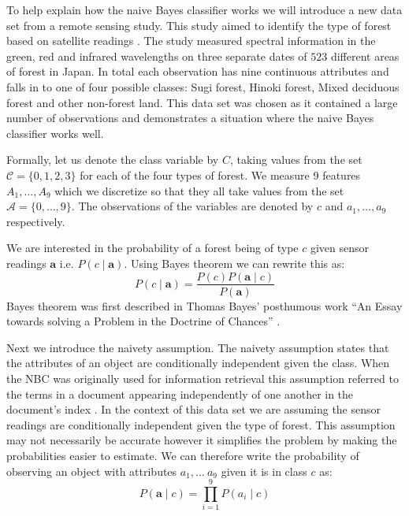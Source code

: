 To help explain how the naive Bayes classifier works we will introduce a new data set from a remote sensing study.
This study aimed to identify the type of forest based on satellite readings \cite{Forrest}.
The study measured spectral information in the green, red and infrared wavelengths on three separate dates of $523$ different areas of forest in Japan.
In total each observation has nine continuous attributes and falls in to one of four possible classes: Sugi forest, Hinoki forest, Mixed deciduous forest and other non-forest land.
This data set was chosen as it contained a large number of observations and demonstrates a situation where the naive Bayes classifier works well.

Formally, let us denote the class variable by $C$, taking values from the set $\mathcal{C} = \{0,1,2,3\}$ for each of the four types of forest.
We measure 9 features $A_1,\dots,A_9$ which we discretize so that they all take values from the set $\mathcal{A} = \{0,\dots,9\}$.
The observations of the variables are denoted by $c$ and $a_1,\dots,a_9$ respectively.

We are interested in the probability of a forest being of type $c$ given sensor readings $\mathbf{a}$ i.e. $P(c \mid \mathbf{a})$.
Using Bayes theorem we can rewrite this as:
\begin{equation} \label{bayes}
	P(c \mid \mathbf{a}) = \frac{P(c)P(\mathbf{a} \mid c)}{P(\mathbf{a})}
\end{equation}
Bayes theorem was first described in Thomas Bayes' posthumous work ``An Essay towards solving a Problem in the Doctrine of Chances'' \cite{Bayes63}.

Next we introduce the naivety assumption.
The naivety assumption states that the attributes of an object are conditionally independent given the class.
When the NBC was originally used for information retrieval this assumption referred to the terms in a document appearing independently of one another in the document's index \cite{Maron60}.
In the context of this data set we are assuming the sensor readings are conditionally independent given the type of forest.
This assumption may not necessarily be accurate however it simplifies the problem by making the probabilities easier to estimate.
We can therefore write the probability of observing an object with attributes $a_1, \dots\ a_9$ given it is in class $c$ as:
\begin{equation} \label{naivety}
	P(\mathbf{a} \mid c) = \prod_{i=1}^9 P(a_i \mid c)
\end{equation}

